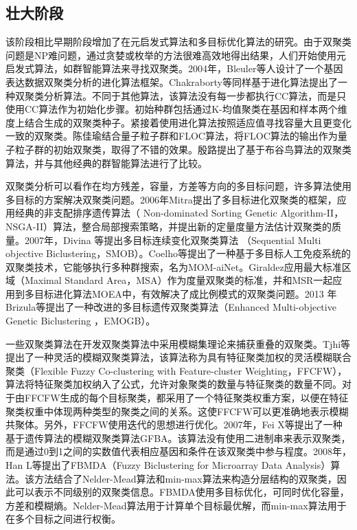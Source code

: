     \subsection{壮大阶段}
    该阶段相比早期阶段增加了在元启发式算法和多目标优化算法的研究。由于双聚类问题是NP难问题，通过贪婪或枚举的方法很难高效地得出结果，人们开始使用元启发式算法，如群智能算法来寻找双聚类。2004年，Bleuler等人设计了一个基因表达数据双聚类分析的进化算法框架。Chakraborty等同样基于进化算法提出了一种双聚类分析算法。不同于其他算法，该算法没有每一步都执行CC算法，而是只使用CC算法作为初始化步骤。初始种群包括通过K-均值聚类在基因和样本两个维度上结合生成的双聚类种子。紧接着使用进化算法按照适应值寻找容量大且更变化一致的双聚类。陈佳瑜结合量子粒子群和FLOC算法，将FLOC算法的输出作为量子粒子群的初始双聚类，取得了不错的效果。殷路提出了基于布谷鸟算法的双聚类算法，并与其他经典的群智能算法进行了比较。
    
    双聚类分析可以看作在均方残差，容量，方差等方向的多目标问题，许多算法使用多目标的方案解决双聚类问题。2006年Mitra提出了多目标进化双聚类的框架，应用经典的非支配排序遗传算法（ Non-dominated Sorting Genetic Algorithm-II，NSGA-II）算法，整合局部搜索策略，并提出新的定量度量方法估计双聚类的质量。2007年，Divina 等提出多目标连续变化双聚类算法 （Sequential Multi objective Biclustering，SMOB）。Coelho等提出了一种基于多目标人工免疫系统的双聚类技术，它能够执行多种群搜索，名为MOM-aiNet。Giraldez应用最大标准区域（Maximal Standard Area，MSA）作为度量双聚类的标准，并和MSR一起应用到多目标进化算法MOEA中，有效解决了成比例模式的双聚类问题。2013 年Brizula等提出了一种改进的多目标遗传双聚类算法（Enhanced Multi-objective Genetic Biclustering ，EMOGB）。    

    一些双聚类算法在开发双聚类算法中采用模糊集理论来捕获重叠的双聚类。Tjhi等提出了一种灵活的模糊双聚类算法，该算法称为具有特征聚类加权的灵活模糊联合聚类（Flexible Fuzzy Co-clustering with Feature-cluster Weighting，FFCFW），算法将特征聚类加权纳入了公式，允许对象聚类的数量与特征聚类的数量不同。对于由FFCFW生成的每个目标聚类，都采用了一个特征聚类权重方案，以便在特征聚类权重中体现两种类型的聚类之间的关系。这使FFCFW可以更准确地表示模糊共聚体。另外，FFCFW使用迭代的思想进行优化。2007年，Fei X等提出了一种基于遗传算法的模糊双聚类算法GFBA。该算法没有使用二进制串来表示双聚类，而是通过0到1之间的实数值代表相应基因和条件在该双聚类中参与程度。2008年，Han L等提出了FBMDA（Fuzzy Biclustering for Microarray Data Analysis）算法。该方法结合了Nelder-Mead算法和min-max算法来构造分层结构的双聚类，因此可以表示不同级别的双聚类信息。FBMDA使用多目标优化，可同时优化容量，方差和模糊熵。Nelder-Mead算法用于计算单个目标最优解，而min-max算法用于在多个目标之间进行权衡。

